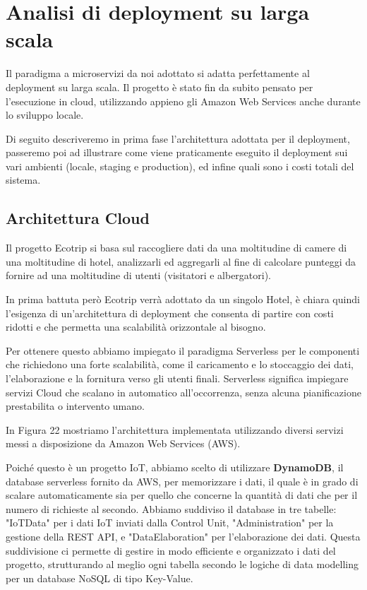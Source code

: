 
\section{Analisi di deployment su larga scala}
Il paradigma a microservizi da noi adottato si adatta perfettamente al deployment su larga scala.
Il progetto è stato fin da subito pensato per l'esecuzione in cloud, utilizzando appieno gli Amazon Web Services anche durante lo sviluppo locale.

Di seguito descriveremo in prima fase l'architettura adottata per il deployment, 
passeremo poi ad illustrare come viene praticamente eseguito il deployment sui vari ambienti (locale, staging e production), 
ed infine quali sono i costi totali del sistema. 

\subsection{Architettura Cloud}

Il progetto Ecotrip si basa sul raccogliere dati da una moltitudine di camere di una moltitudine di hotel, 
analizzarli ed aggregarli al fine di calcolare punteggi da fornire ad una moltitudine di utenti (visitatori e albergatori).

In prima battuta però Ecotrip verrà adottato da un singolo Hotel, è chiara quindi l'esigenza di un'architettura di deployment 
che consenta di partire con costi ridotti e che permetta una scalabilità orizzontale al bisogno.

Per ottenere questo abbiamo impiegato il paradigma Serverless per le componenti che richiedono una forte scalabilità, 
come il caricamento e lo stoccaggio dei dati, l'elaborazione e la fornitura verso gli utenti finali. 
Serverless significa impiegare servizi Cloud che scalano in automatico all'occorrenza, senza alcuna pianificazione prestabilita o intervento umano.

In Figura 22 mostriamo l'architettura implementata utilizzando diversi servizi messi a disposizione da Amazon Web Services (AWS).

Poiché questo è un progetto IoT, abbiamo scelto di utilizzare \textbf{DynamoDB}, il database serverless fornito da AWS, per memorizzare i dati, il quale è in grado di scalare automaticamente sia per quello che concerne la quantità di dati che per il numero di richieste al secondo.
Abbiamo suddiviso il database in tre tabelle: "IoTData" per i dati IoT inviati dalla Control Unit, "Administration" per la gestione della REST API, e "DataElaboration" per l'elaborazione dei dati. Questa suddivisione ci permette di gestire in modo efficiente e organizzato i dati del progetto, strutturando al meglio ogni tabella secondo le logiche di data modelling per un database NoSQL di tipo Key-Value.

